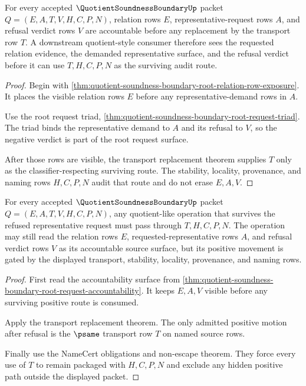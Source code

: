 \begin{theorem}
\label{thm:quotient-soundness-boundary-root-request-accountability}
For every accepted $\QuotientSoundnessBoundaryUp$ packet $Q=(E,A,T,V,H,C,P,N)$, relation rows $E$, representative-request rows $A$, and refusal verdict rows $V$ are accountable before any replacement by the transport row $T$. A downstream quotient-style consumer therefore sees the requested relation evidence, the demanded representative surface, and the refusal verdict before it can use $T,H,C,P,N$ as the surviving audit route.
\end{theorem}
\begin{proof}
Begin with \autoref{thm:quotient-soundness-boundary-root-relation-row-exposure}. It places the visible relation rows $E$ before any representative-demand rows in $A$.

Use the root request triad, \autoref{thm:quotient-soundness-boundary-root-request-triad}. The triad binds the representative demand to $A$ and its refusal to $V$, so the negative verdict is part of the root request surface.

After those rows are visible, the transport replacement theorem supplies $T$ only as the classifier-respecting surviving route. The stability, locality, provenance, and naming rows $H,C,P,N$ audit that route and do not erase $E,A,V$.
\end{proof}

\begin{theorem}
\label{thm:quotient-soundness-boundary-transport-gate}
For every accepted $\QuotientSoundnessBoundaryUp$ packet $Q=(E,A,T,V,H,C,P,N)$, any quotient-like operation that survives the refused representative request must pass through $T,H,C,P,N$. The operation may still read the relation rows $E$, requested-representative rows $A$, and refusal verdict rows $V$ as its accountable source surface, but its positive movement is gated by the displayed transport, stability, locality, provenance, and naming rows.
\end{theorem}
\begin{proof}
First read the accountability surface from \autoref{thm:quotient-soundness-boundary-root-request-accountability}. It keeps $E,A,V$ visible before any surviving positive route is consumed.

Apply the transport replacement theorem. The only admitted positive motion after refusal is the $\psame$ transport row $T$ on named source rows.

Finally use the NameCert obligations and non-escape theorem. They force every use of $T$ to remain packaged with $H,C,P,N$ and exclude any hidden positive path outside the displayed packet.
\end{proof}


